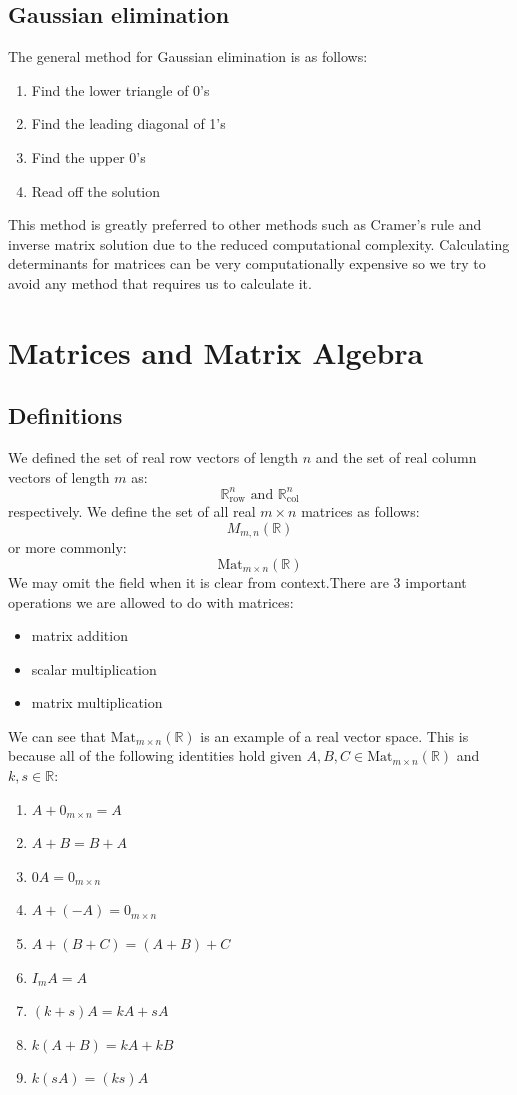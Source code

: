 \documentclass[12pt]{article}
\newcommand{\mat}[3]{\text{Mat}_{#1\times#2}(\mathbb{#3})}
\begin{document}
\subsection*{Gaussian elimination}
The general method for Gaussian elimination is as follows:
\begin{enumerate}
    \item Find the lower triangle of 0's
    \item Find the leading diagonal of 1's
    \item Find the upper 0's
    \item Read off the solution
\end{enumerate}
This method is greatly preferred to other methods such as Cramer's rule and inverse matrix solution due to the reduced computational complexity. Calculating determinants for matrices can be very computationally expensive so we try to avoid any method that requires us to calculate it.
\section{Matrices and Matrix Algebra}
\subsection*{Definitions}
We defined the set of real row vectors of length \(n\) and the set of real column vectors of length \(m\) as:
\[\mathbb{R}^n_{\text{row}}\text{ and }\mathbb{R}^n_{\text{col}}\]
respectively. We define the set of all real \(m\times n\) matrices as follows:
\[M_{m,n}(\mathbb{R})\]
or more commonly:
\[\text{Mat}_{m\times n}(\mathbb{R})\]
We may omit the field when it is clear from context.There are 3 important operations we are allowed to do with matrices:
\begin{itemize}
    \item matrix addition
    \item scalar multiplication
    \item matrix multiplication
\end{itemize}
We can see that \(\mat{m}{n}{R}\) is an example of a real vector space. This is because all of the following identities hold given \(A,B,C\in\mat{m}{n}{R}\) and \(k,s\in\mathbb{R}\):
\begin{enumerate}
    \item \(A + 0_{m\times n}=A\)
    \item \(A+B=B+A\)
    \item \(0A=0_{m\times n}\)
    \item \(A + (-A)=0_{m\times n}\)
    \item \(A+ (B+C)=(A+B)+C\)
    \item \(I_mA=A\)
    \item \((k+s)A=kA+sA\)
    \item \(k(A+B)=kA+kB\)
    \item \(k(sA)=(ks)A\)
\end{enumerate}
\end{document}
